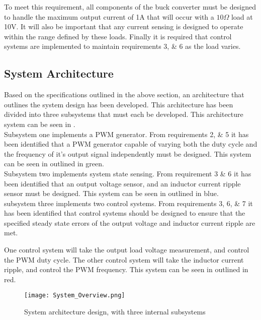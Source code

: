 To meet this requirement, all components of the buck converter must be designed to handle the maximum output current of 1A that will occur with a $10\Omega$ load at 10V. It will also be important that any current sensing is designed to operate within the range defined by these loads. Finally it is required that control systems are implemented to maintain requirements 3, \& 6 as the load varies. 

\subsection{System Architecture}

Based on the specifications outlined in the above section, an architecture that outlines the system design has been developed. This architecture has been divided into three subsystems that must each be developed. This architecture system can be seen in .\\

Subsystem one implements a PWM generator. From requirements 2, \& 5 it has been identified that a PWM generator capable of varying both the duty cycle and the frequency of it's output signal independently must be designed. This system can be seen in  outlined in green.\\

Subsystem two implements system state sensing. From requirement 3 \& 6 it has been identified that an output voltage sensor, and an inductor current ripple sensor must be designed. This system can be seen in  outlined in blue.\\

subsystem three implements two control systems. From requirements 3, 6, \& 7 it has been identified that control systems should be designed to ensure that the specified steady state errors of the output voltage and inductor current ripple are met. 

One control system will take the output load voltage measurement, and control the PWM duty cycle. The other control system will take the inductor current ripple, and control the PWM frequency. This system can be seen in  outlined in red.

\newpage

\begin{figure}[!h]
    \texttt{[image: System\_Overview.png]}
    \caption{System architecture design, with three internal subsystems}
    \label{F:sys_overview}
\end{figure}



